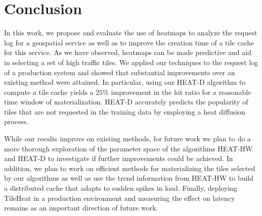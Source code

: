 \documentclass[11pt, oneside]{report}
\begin{document}



\section{Conclusion}
In this work, we propose and evaluate the use of heatmaps to analyze the request log for a geospatial service as well as to improve the creation time of a tile cache for this service. 
As we have observed, heatmaps can be made predictive and aid in selecting a set of high traffic tiles. We applied our techniques to the request log of a production system and showed that substantial improvements over an existing method were attained. In particular, using our HEAT-D algorithm to compute a tile cache yields a $25\%$ improvement in the hit ratio for a reasonable time window of materialization. HEAT-D accurately predicts the popularity of tiles that are not requested in the training data by employing a heat diffusion process. 

While our results improve on existing methods, for future work we plan to do a more thorough exploration of the parameter space of the algorithms HEAT-HW and HEAT-D to investigate if further improvements could be achieved. In addition, we plan to work on efficient methods for materializing the tiles selected by our algorithms as well as use the trend information from HEAT-HW to build a distributed cache that adapts to sudden spikes in load. 
Finally, deploying TileHeat in a production environment and measuring the effect on latency remains as an important direction of future work.
\end{document}
